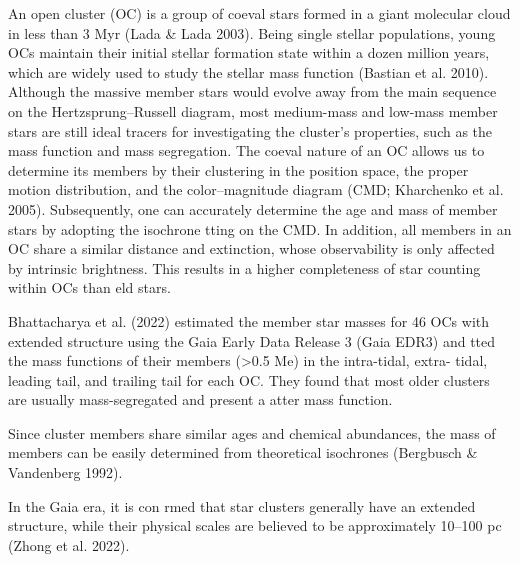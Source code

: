 \documentclass[../Main.tex]{subfiles}
\begin{document}
{An open cluster (OC) is a group of coeval stars formed in a
giant molecular cloud in less than 3 Myr (Lada & Lada 2003).
Being single stellar populations, young OCs maintain their initial
stellar formation state within a dozen million years, which are
widely used to study the stellar mass function (Bastian et al.
2010). Although the massive member stars would evolve away
from the main sequence on the Hertzsprung–Russell diagram,
most medium-mass and low-mass member stars are still ideal
tracers for investigating the cluster’s properties, such as the
mass function and mass segregation. The coeval nature of an
OC allows us to determine its members by their clustering in
the position space, the proper motion distribution, and the color–magnitude diagram (CMD; Kharchenko et al. 2005).
Subsequently, one can accurately determine the age and mass of
member stars by adopting the isochrone tting on the CMD. In
addition, all members in an OC share a similar distance and
extinction, whose observability is only affected by intrinsic
brightness. This results in a higher completeness of star counting
within OCs than eld stars.

Bhattacharya et al. (2022) estimated the member
star masses for 46 OCs with extended structure using the Gaia
Early Data Release 3 (Gaia EDR3) and tted the mass
functions of their members (>0.5 Me) in the intra-tidal, extra-
tidal, leading tail, and trailing tail for each OC. They found that
most older clusters are usually mass-segregated and present a
atter mass function.

Since cluster members share similar ages and chemical
abundances, the mass of members can be easily determined
from theoretical isochrones (Bergbusch & Vandenberg 1992).

In the Gaia era, it is con rmed
that star clusters generally have an extended structure, while
their physical scales are believed to be approximately
10–100 pc (Zhong et al. 2022). 

}
\end{document}
